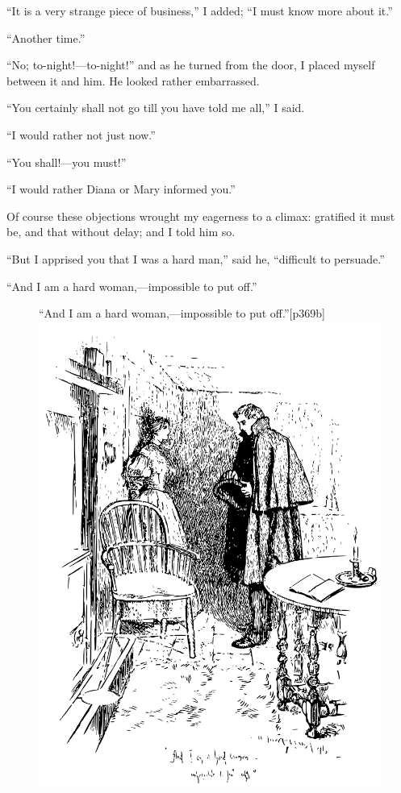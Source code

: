 \enquote{It is a very strange piece of business,} I added; \enquote{I
	must know more about it.}

\enquote{Another time.}

\enquote{No; to-night!---to-night!} and as he turned from the door, I
placed myself between it and him. He looked rather embarrassed.

\enquote{You certainly shall not go till you have told me all,} I said.

\enquote{I would rather not just now.}

\enquote{You shall!---you must!}

\enquote{I would rather Diana or Mary informed you.}

Of course these objections wrought my eagerness to a climax: gratified
it must be, and that without delay; and I told him so.

\enquote{But I apprised you that I was a hard man,} said he,
\enquote{difficult to persuade.}

\enquote{And I am a hard woman,---impossible to put off.}

\begin{figure}
	\begin{sidecaption}{\enquote{And I am a hard woman,\linebreak---impossible to put off.}}[p369b]
		\centering
		\includegraphics[width=\linewidth]{images/p369b.pdf}
	\end{sidecaption}
\end{figure}


